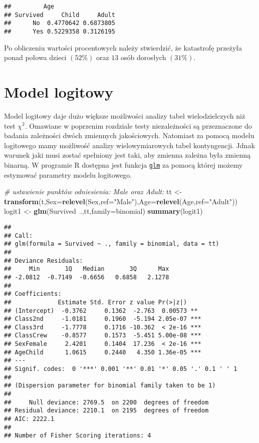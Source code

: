 \documentclass[polish,]{book}
\newenvironment{Shaded}{\begin{snugshade}}{\end{snugshade}}
\newcommand{\CommentTok}[1]{\textcolor[rgb]{0.56,0.35,0.01}{\textit{#1}}}
\newcommand{\DataTypeTok}[1]{\textcolor[rgb]{0.13,0.29,0.53}{#1}}
\newcommand{\KeywordTok}[1]{\textcolor[rgb]{0.13,0.29,0.53}{\textbf{#1}}}
\newcommand{\NormalTok}[1]{#1}
\newcommand{\OperatorTok}[1]{\textcolor[rgb]{0.81,0.36,0.00}{\textbf{#1}}}
\newcommand{\StringTok}[1]{\textcolor[rgb]{0.31,0.60,0.02}{#1}}
\begin{document}
\begin{verbatim}
##         Age
## Survived     Child     Adult
##      No  0.4770642 0.6873805
##      Yes 0.5229358 0.3126195
\end{verbatim}

Po obliczeniu wartości procentowych należy stwierdzić, że katastrofę przeżyła ponad połowa dzieci \((52\%)\) oraz \(13\) osób dorosłych \((31\%)\).

\hypertarget{part_83}{%
\section{Model logitowy}\label{part_83}}

Model logitowy daje dużo większe możliwości analizy tabel wielodzielczych niż test
\(\chi^2\). Omawiane w poprzenim rozdziale testy niezależności są przeznaczone do badania
zależności dwóch zmiennych jakościowych. Natomiast za pomocą modelu logitowego
mamy możliwość analizy wielowymiarowych tabel kontyngencji. Jdnak warunek jaki
musi zostać spełniony jest taki, aby zmienna zależna była zmienną binarną. W programie R dostępna jest funkcja \href{https://rdrr.io/r/stats/glm.html}{\texttt{glm}} za pomocą której możemy estymować
parametry modelu logitowego.

\begin{Shaded}
\begin{Highlighting}[]
\CommentTok{# ustawienie punktów odniesienia: Male oraz Adult:}
\NormalTok{tt <-}\StringTok{ }\KeywordTok{transform}\NormalTok{(t,}\DataTypeTok{Sex=}\KeywordTok{relevel}\NormalTok{(Sex,}\DataTypeTok{ref=}\StringTok{"Male"}\NormalTok{),}\DataTypeTok{Age=}\KeywordTok{relevel}\NormalTok{(Age,}\DataTypeTok{ref=}\StringTok{"Adult"}\NormalTok{))}
\NormalTok{logit1 <-}\StringTok{ }\KeywordTok{glm}\NormalTok{(Survived}\OperatorTok{~}\NormalTok{.,tt,}\DataTypeTok{family=}\NormalTok{binomial)}
\KeywordTok{summary}\NormalTok{(logit1)}
\end{Highlighting}
\end{Shaded}

\begin{verbatim}
## 
## Call:
## glm(formula = Survived ~ ., family = binomial, data = tt)
## 
## Deviance Residuals: 
##     Min       1Q   Median       3Q      Max  
## -2.0812  -0.7149  -0.6656   0.6858   2.1278  
## 
## Coefficients:
##             Estimate Std. Error z value Pr(>|z|)    
## (Intercept)  -0.3762     0.1362  -2.763  0.00573 ** 
## Class2nd     -1.0181     0.1960  -5.194 2.05e-07 ***
## Class3rd     -1.7778     0.1716 -10.362  < 2e-16 ***
## ClassCrew    -0.8577     0.1573  -5.451 5.00e-08 ***
## SexFemale     2.4201     0.1404  17.236  < 2e-16 ***
## AgeChild      1.0615     0.2440   4.350 1.36e-05 ***
## ---
## Signif. codes:  0 '***' 0.001 '**' 0.01 '*' 0.05 '.' 0.1 ' ' 1
## 
## (Dispersion parameter for binomial family taken to be 1)
## 
##     Null deviance: 2769.5  on 2200  degrees of freedom
## Residual deviance: 2210.1  on 2195  degrees of freedom
## AIC: 2222.1
## 
## Number of Fisher Scoring iterations: 4
\end{verbatim}
\end{document}
